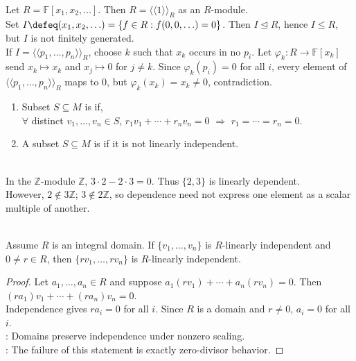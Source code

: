 \begin{example} \label{ex:finitely-generated-module-with-non-fg-submodule} \\
Let $R=\mathbb{F}[x_1,x_2,\ldots]$. Then $R=\langle\!\langle1\rangle\!\rangle_R$ as an $R$-module.\\
Set $I\defeq (x_1,x_2,\ldots)=\{f\in R:f(0,0,\ldots)=0\}$. Then $I\trianglelefteq R$, hence $I\leq R$, but $I$ is not finitely generated.\\
If $I=\langle\!\langle p_1,\ldots,p_n\rangle\!\rangle_R$, choose $k$ such that $x_k$ occurs in no $p_i$. Let $\varphi_k:R\to\mathbb{F}[x_k]$ send $x_k\mapsto x_k$ and $x_j\mapsto0$ for $j\neq k$. Since $\varphi_k(p_i)=0$ for all $i$, every element of $\langle\!\langle p_1,\ldots,p_n\rangle\!\rangle_R$ maps to $0$, but $\varphi_k(x_k)=x_k\neq0$, contradiction.
\end{example}

\begin{definition} \label{def:module-linear-independence} 
\begin{enumerate}[label=(\roman*)]
\setlength{\itemsep}{0pt}
\item Subset $S\subseteq M$ is  if,\\
$\forall$ distinct $v_1,\ldots,v_n\in S$, $r_1v_1+\cdots+r_nv_n=0$ $\Longrightarrow$ $r_1=\cdots=r_n=0$.
\item A subset $S\subseteq M$ is  if it is not linearly independent.
\end{enumerate}
\end{definition}

\begin{example} \label{ex:module-dependence-need-not-solve-for-vector} \\
In the $\mathbb{Z}$-module $\mathbb{Z}$, $3\cdot2-2\cdot3=0$. Thus $\{2,3\}$ is linearly dependent.\\
However, $2\notin 3\mathbb{Z}$; $3\notin 2\mathbb{Z}$, so dependence need not express one element as a scalar multiple of another.
\end{example}

\begin{proposition} \label{prop:integral-domain-scaling-preserves-independence} \\
Assume $R$ is an integral domain. If $\{v_1,\ldots,v_n\}$ is $R$-linearly independent and $0\neq r\in R$, then $\{rv_1,\ldots,rv_n\}$ is $R$-linearly independent.
\begin{proof}
Let $a_1,\ldots,a_n\in R$ and suppose $a_1(rv_1)+\cdots+a_n(rv_n)=0$. Then $(ra_1)v_1+\cdots+(ra_n)v_n=0$.\\
Independence gives $ra_i=0$ for all $i$. Since $R$ is a domain and $r\neq0$, $a_i=0$ for all $i$.\\
: Domains preserve independence under nonzero scaling.\\
: The failure of this statement is exactly zero-divisor behavior.
\end{proof}
\end{proposition}
